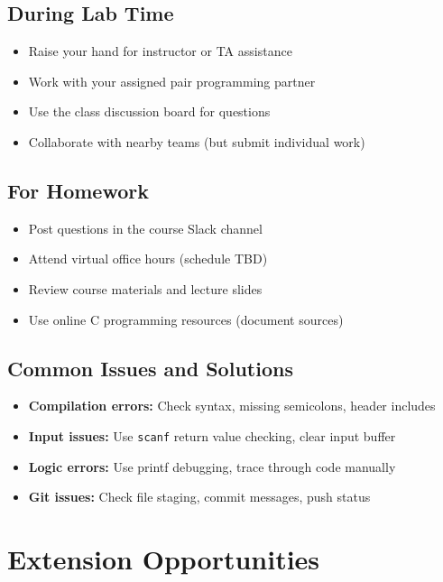 \documentclass[11pt,a4paper]{article}
\begin{document}
\subsection{During Lab Time}
\begin{itemize}
    \item Raise your hand for instructor or TA assistance
    \item Work with your assigned pair programming partner
    \item Use the class discussion board for questions
    \item Collaborate with nearby teams (but submit individual work)
\end{itemize}

\subsection{For Homework}
\begin{itemize}
    \item Post questions in the course Slack channel
    \item Attend virtual office hours (schedule TBD)
    \item Review course materials and lecture slides
    \item Use online C programming resources (document sources)
\end{itemize}

\subsection{Common Issues and Solutions}
\begin{itemize}
    \item \textbf{Compilation errors:} Check syntax, missing semicolons, header includes
    \item \textbf{Input issues:} Use \texttt{scanf} return value checking, clear input buffer
    \item \textbf{Logic errors:} Use printf debugging, trace through code manually
    \item \textbf{Git issues:} Check file staging, commit messages, push status
\end{itemize}

\section{Extension Opportunities}
\end{document}
